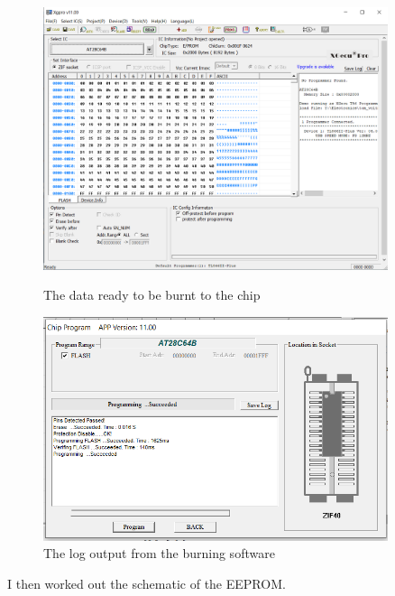 \begin{figure} [H]
    \centering
    \begin{minipage}[t]{0.45\textwidth}
        \centering
        \includegraphics[width=0.9\textwidth]{images/eepromBurning1.png}
        \caption{The data ready to be burnt to the chip}
        \label{fig:eepromBurning1}
    \end{minipage}\hfill
    \begin{minipage}[t] {0.45\textwidth}
        \centering
        \includegraphics[width=0.9\textwidth]{images/eepromBurning2.png}
        \caption{The log output from the burning software}
         \label{fig:eepromBurning2}
    \end{minipage}
\end{figure}
\noindent I then worked out the schematic of the EEPROM.
